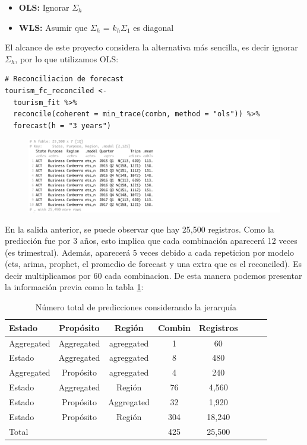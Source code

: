 \begin{itemize}
\item \textbf{OLS: } Ignorar $\Sigma_h$ 
\item \textbf{WLS: } Asumir que $\Sigma_h$ = $k_h \Sigma_1$ es diagonal
\end{itemize}

El alcance de este proyecto considera la alternativa más sencilla, es decir ignorar  $\Sigma_h$, por lo que utilizamos OLS:

\begin{lstlisting}
# Reconciliacion de forecast
tourism_fc_reconciled <- 
  tourism_fit %>% 
  reconcile(coherent = min_trace(combn, method = "ols")) %>%
  forecast(h = "3 years")
\end{lstlisting}

 \begin{figure}[!h]
      \includegraphics[width=150mm]{imgs/14_reconciled.png}
      \label{fig:snowyplot}
\end{figure}

En la salida anterior, se puede observar que hay 25,500 registros. Como la predicción fue por 3 años, esto implica que cada combinación aparecerá 12 veces (es trimestral). Además, aparecerá 5 veces debido a cada repeticion por modelo (ets, arima, prophet, el promedio de forecast y una extra que es el reconciled). Es decir multiplicamos por 60 cada combinacion. De esta manera podemos presentar la información previa como la tabla \ref{tbl: res1}:

\newpage

\begin{table}[!h]
    \centering
    \begin{tabular}{p{2cm}|c|c|c|c|c|c|c}
    Estado  & Propósito & Región & Combin & Registros \\
    \hline
    \hline
    Aggregated & Aggregated &  agreggated  & 1 & 60 \\
    Estado & Aggregated &  agreggated  & 8 & 480 \\
    Aggregated & Propósito &  agreggated  & 4 & 240 \\
    Estado & Aggregated & Región  & 76 & 4,560  \\
    Estado & Propósito & Aggregated  & 32 & 1,920 \\
    Estado & Propósito & Región  & 304 & 18,240 \\
    \hline
    Total &  &   & 425 & 25,500  \\
    \hline
    \end{tabular}
    \caption{Número total de predicciones considerando la jerarquía}
    \label{tbl: res1}
\end{table}

